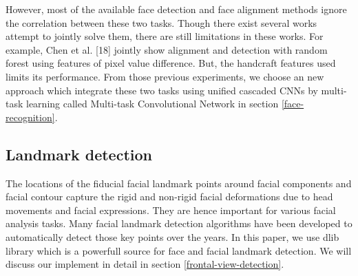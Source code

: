 \documentclass[journal, twocolumn]{IEEEtran}
\begin{document}
However, most of the available face detection and face alignment methods ignore the correlation between these two tasks. Though there exist several works attempt to jointly solve them, there are still limitations in these works. For example, Chen et al. [18] jointly show alignment and detection with random forest using features of pixel value difference. But, the handcraft features used limits its performance. From those previous experiments, we choose an new approach which integrate these two tasks using unified cascaded CNNs by multi-task learning called Multi-task Convolutional Network in section \ref{face-recognition}.


\subsection{Landmark detection}
The locations of the fiducial facial landmark points around facial components and facial contour capture  the  rigid  and  non-rigid  facial  deformations  due to  head  movements  and  facial  expressions.  They  are hence important for various facial analysis tasks. Many facial landmark detection algorithms have been developed to automatically detect those key points over the years. In this paper, we use dlib library which is a powerfull source for face and facial landmark detection. We will discuss our implement in detail in section \ref{frontal-view-detection}.
\end{document}

